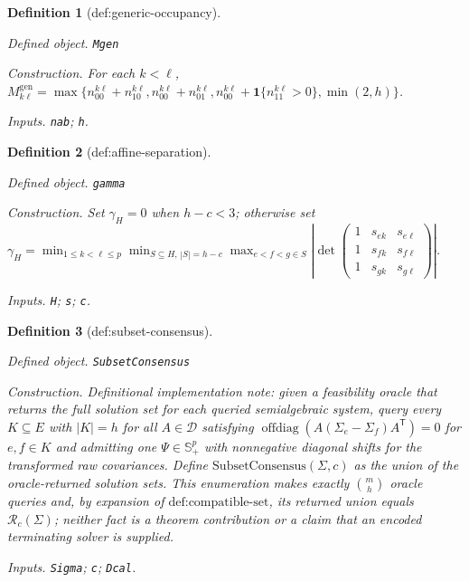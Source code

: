 \documentclass{article}
\newtheorem{definition}{Definition}
\begin{document}
\begin{definition}[def:generic-occupancy]\label{def:generic-occupancy}
\par\smallskip\noindent\emph{Defined object.} \texttt{Mgen}
\par\smallskip\noindent\emph{Construction.} For each \(k<\ell\), \(M_{k\ell}^{\mathrm{gen}}=\max\{n_{00}^{k\ell}+n_{10}^{k\ell},n_{00}^{k\ell}+n_{01}^{k\ell},n_{00}^{k\ell}+\mathbf 1\{n_{11}^{k\ell}>0\},\min(2,h)\}\).
\par\smallskip\noindent\emph{Inputs.} \texttt{nab}; \texttt{h}.
\end{definition}

\begin{definition}[def:affine-separation]\label{def:affine-separation}
\par\smallskip\noindent\emph{Defined object.} \texttt{gamma}
\par\smallskip\noindent\emph{Construction.} Set \(\gamma_H=0\) when \(h-c<3\); otherwise set \(\gamma_H=\min_{1\le k<\ell\le p}\min_{S\subseteq H,\,|S|=h-c}\max_{e<f<g\in S}\left|\det\begin{pmatrix}1&s_{ek}&s_{e\ell}\\1&s_{fk}&s_{f\ell}\\1&s_{gk}&s_{g\ell}\end{pmatrix}\right|\).
\par\smallskip\noindent\emph{Inputs.} \texttt{H}; \texttt{s}; \texttt{c}.
\end{definition}

\begin{definition}[def:subset-consensus]\label{def:subset-consensus}
\par\smallskip\noindent\emph{Defined object.} \texttt{SubsetConsensus}
\par\smallskip\noindent\emph{Construction.} Definitional implementation note: given a feasibility oracle that returns the full solution set for each queried semialgebraic system, query every \(K\subseteq E\) with \(|K|=h\) for all \(A\in\mathcal D\) satisfying \(\operatorname{offdiag}(A(\Sigma_e-\Sigma_f)A^{\mathsf T})=0\) for \(e,f\in K\) and admitting one \(\Psi\in\mathbb S_{+}^p\) with nonnegative diagonal shifts for the transformed raw covariances. Define \(\text{SubsetConsensus}(\Sigma,c)\) as the union of the oracle-returned solution sets. This enumeration makes exactly \(\binom{m}{h}\) oracle queries and, by expansion of \(\text{def:compatible-set}\), its returned union equals \(\mathcal R_c(\Sigma)\); neither fact is a theorem contribution or a claim that an encoded terminating solver is supplied.
\par\smallskip\noindent\emph{Inputs.} \texttt{Sigma}; \texttt{c}; \texttt{Dcal}.
\end{definition}
\end{document}
